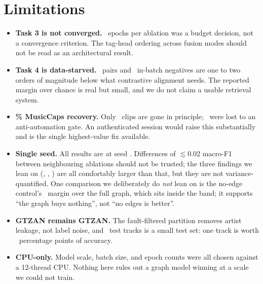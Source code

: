 \documentclass[10pt,a4paper]{article}
\begin{document}
\section{Limitations}
\label{sec:limits}
\begin{itemize}\itemsep2pt
\item \textbf{Task 3 is not converged.} \tThreeRunEpochs\ epochs per ablation was a budget
      decision, not a convergence criterion. The tag-head ordering across fusion
      modes should not be read as an architectural result.
\item \textbf{Task 4 is data-starved.} \tFourNTrain\ pairs and \tFourBatchSize\ in-batch
      negatives are one to two orders of magnitude below what contrastive
      alignment needs. The reported margin over chance is real but small, and we
      do not claim a usable retrieval system.
\item \textbf{\mcRecoveryPct\% MusicCaps recovery.} Only
      \mcPermanentlyGone\ clips are gone in principle; \mcBotCheck\ were lost to
      an anti-automation gate. An authenticated session would raise this
      substantially and is the single highest-value fix available.
\item \textbf{Single seed.} All results are at seed \cfgSeed. Differences of
      $\lesssim 0.02$ macro-F1 between neighbouring ablations should not be
      trusted; the three findings we lean on
      (\tTwoSimOverFull, \tTwoCnnOverBestGnn, \tOneShortcutGap) are all
      comfortably larger than that, but they are not variance-quantified. One
      comparison we deliberately do \emph{not} lean on is the no-edge control's
      \tTwoNoEdgeOverFull\ margin over the full graph, which sits inside the band;
      it supports ``the graph buys nothing'', not ``no edges is better''.
\item \textbf{GTZAN remains GTZAN.} The fault-filtered partition removes artist
      leakage, not label noise, and \gtzanNTest\ test tracks is a small test set: one
      track is worth \gtzanOneTrackPct\ percentage points of accuracy.
\item \textbf{CPU-only.} Model scale, batch size, and epoch counts were all
      chosen against a 12-thread CPU. Nothing here rules out a graph model
      winning at a scale we could not train.
\end{itemize}

\end{document}
